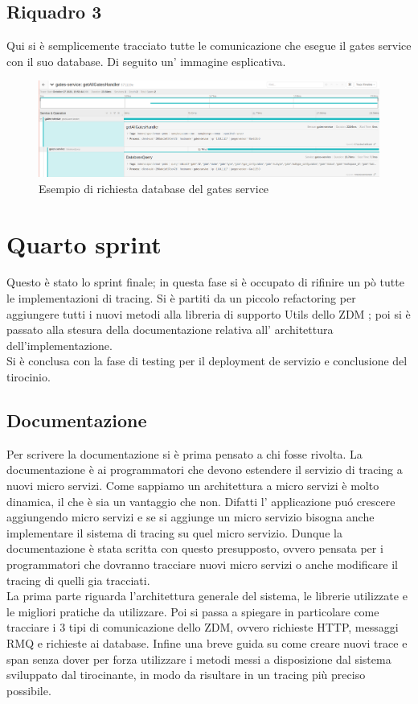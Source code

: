 \documentclass[a4paper,12pt,titlepage,italian,openany]{report}
\begin{document}
\subsection{Riquadro 3}
Qui si è semplicemente tracciato tutte le comunicazione che esegue il gates service con il suo database. Di seguito un' immagine esplicativa.
\begin{figure}[H]
    \includegraphics[scale=0.21]{90.png}
    \centering
    \caption{Esempio di richiesta database del gates service}
\end{figure}
\newpage
\section{Quarto sprint}
Questo è stato lo sprint finale; in questa fase si è occupato di rifinire un pò tutte le implementazioni di tracing. Si è partiti da un piccolo refactoring per aggiungere tutti i nuovi metodi alla libreria di supporto Utils dello ZDM\cite{zdm:1} ; poi si è passato alla stesura della documentazione relativa all' architettura dell'implementazione.\\Si è conclusa con la fase di testing per il deployment de servizio e conclusione del tirocinio.
\subsection{Documentazione}
Per scrivere la documentazione si è prima pensato a chi fosse rivolta. La documentazione è ai programmatori che devono estendere il servizio di tracing a nuovi micro servizi. Come sappiamo un architettura a micro servizi è molto dinamica, il che è sia un vantaggio che non. Difatti l' applicazione puó crescere aggiungendo micro servizi e se si aggiunge un micro servizio bisogna anche implementare il sistema di tracing su quel micro servizio.
Dunque la documentazione è stata scritta con questo presupposto, ovvero pensata per i programmatori che dovranno tracciare nuovi micro servizi o anche modificare il tracing di quelli gia tracciati.\\
La prima parte riguarda l'architettura generale del sistema, le librerie utilizzate e le migliori pratiche da utilizzare. Poi si passa a spiegare in particolare come tracciare i 3 tipi di comunicazione dello ZDM\cite{zdm:1}, ovvero richieste HTTP, messaggi RMQ e richieste ai database. 
Infine una breve guida su come creare nuovi trace e span senza dover per forza utilizzare i metodi messi a disposizione dal sistema sviluppato dal tirocinante, in modo da risultare in un tracing più preciso possibile. 
\end{document}
